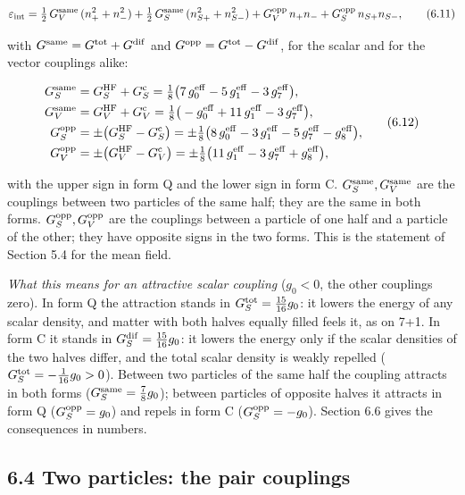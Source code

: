 \documentclass[
  10pt,
]{article}
\begin{document}
\[\varepsilon_{\rm int}=\tfrac12\,G_V^{\rm same}\,(n_+^2+n_-^2)+\tfrac12\,G_S^{\rm same}\,(n_{S+}^2+n_{S-}^2)+G_V^{\rm opp}\,n_+n_-+G_S^{\rm opp}\,n_{S+}n_{S-},\tag{6.11}\]

with \(G^{\rm same}=G^{\rm tot}+G^{\rm dif}\) and
\(G^{\rm opp}=G^{\rm tot}-G^{\rm dif}\), for the scalar and for the
vector couplings alike:

\[\begin{aligned}
G_S^{\rm same}&=G_S^{\rm HF}+G_S^{\rm c}=\tfrac18\big(7\,g_0^{\rm eff}-5\,g_1^{\rm eff}-3\,g_7^{\rm eff}\big),\\
G_V^{\rm same}&=G_V^{\rm HF}+G_V^{\rm c}=\tfrac18\big(-g_0^{\rm eff}+11\,g_1^{\rm eff}-3\,g_7^{\rm eff}\big),\\
G_S^{\rm opp}&=\pm\big(G_S^{\rm HF}-G_S^{\rm c}\big)=\pm\tfrac18\big(8\,g_0^{\rm eff}-3\,g_1^{\rm eff}-5\,g_7^{\rm eff}-g_8^{\rm eff}\big),\\
G_V^{\rm opp}&=\pm\big(G_V^{\rm HF}-G_V^{\rm c}\big)=\pm\tfrac18\big(11\,g_1^{\rm eff}-3\,g_7^{\rm eff}+g_8^{\rm eff}\big),
\end{aligned}\tag{6.12}\]

with the upper sign in form Q and the lower sign in form C.
\(G_S^{\rm same},G_V^{\rm same}\) are the couplings between two
particles of the same half; they are the same in both forms.
\(G_S^{\rm opp},G_V^{\rm opp}\) are the couplings between a particle of
one half and a particle of the other; they have opposite signs in the
two forms. This is the statement of Section 5.4 for the mean field.

\emph{What this means for an attractive scalar coupling} (\(g_0<0\), the
other couplings zero). In form Q the attraction stands in
\(G_S^{\rm tot}=\tfrac{15}{16}g_0\): it lowers the energy of any scalar
density, and matter with both halves equally filled feels it, as on 7+1.
In form C it stands in \(G_S^{\rm dif}=\tfrac{15}{16}g_0\): it lowers
the energy only if the scalar densities of the two halves differ, and
the total scalar density is weakly repelled
(\(G_S^{\rm tot}=-\tfrac1{16}g_0>0\)). Between two particles of the same
half the coupling attracts in both forms
(\(G_S^{\rm same}=\tfrac78g_0\)); between particles of opposite halves
it attracts in form Q (\(G_S^{\rm opp}=g_0\)) and repels in form C
(\(G_S^{\rm opp}=-g_0\)). Section 6.6 gives the consequences in numbers.

\hypertarget{two-particles-the-pair-couplings}{%
\subsection{6.4 Two particles: the pair
couplings}\label{two-particles-the-pair-couplings}}
\end{document}

